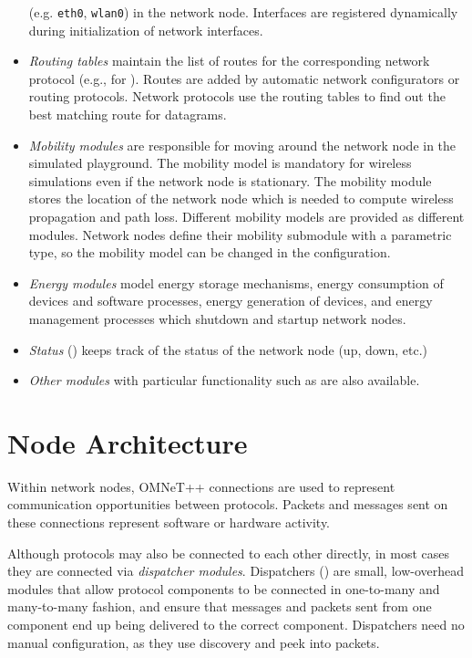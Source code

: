\begin{itemize}
     (e.g. \texttt{eth0}, \texttt{wlan0}) in the network node. Interfaces
     are registered dynamically during initialization of network interfaces.
  \item \emph{Routing tables} maintain the list of routes for the corresponding
     network protocol (e.g.,  for ).
     Routes are added by automatic network configurators or routing protocols.
     Network protocols use the routing tables to find out the best matching
     route for datagrams.
  \item \emph{Mobility modules} are responsible for moving around the network
     node in the simulated playground. The mobility model is mandatory for
     wireless simulations even if the network node is stationary. The mobility
     module stores the location of the network node which is needed to compute
     wireless propagation and path loss. Different mobility models are provided
     as different modules. Network nodes define their mobility submodule with
     a parametric type, so the mobility model can be changed in the configuration.
  \item \emph{Energy modules} model energy storage mechanisms, energy
     consumption of devices and software processes, energy generation of devices,
     and energy management processes which shutdown and startup network nodes.
  \item \emph{Status} () keeps track of the status of the
     network node (up, down, etc.)
  \item \emph{Other modules} with particular functionality such as
      are also available.
\end{itemize}

\section{Node Architecture}

Within network nodes, OMNeT++ connections are used to represent 
communication opportunities between protocols. Packets and 
messages sent on these connections represent software or hardware activity.

Although protocols may also be connected to each other directly, 
in most cases they are connected via \emph{dispatcher modules}.
Dispatchers () are small, low-overhead modules 
that allow protocol components to be connected in one-to-many and many-to-many 
fashion, and ensure that messages and packets sent from one component end up
being delivered to the correct component. Dispatchers need no manual 
configuration, as they use discovery and peek into packets.

